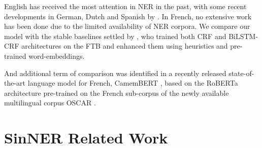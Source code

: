 

English has received the most attention in NER in the past, with some recent developments in German, Dutch and Spanish by \citet{strakova-etal-2019-neural}. In French, no extensive work has been done due to the limited availability of NER corpora. We compare our model with the stable baselines settled by \citep{dupont-2017-exploration}, who trained both CRF and BiLSTM-CRF architectures on the FTB and enhanced them using heuristics and pre-trained word-embeddings.

And additional term of comparison was identified in a recently released state-of-the-art language model for French, CamemBERT \citep{martin-etal-2020-camembert}, based on the RoBERTa architecture pre-trained on the French sub-corpus of the newly available multilingual corpus OSCAR \citep{ortiz-suarez-etal-2019-asynchronous}.



\section{SinNER Related Work}

